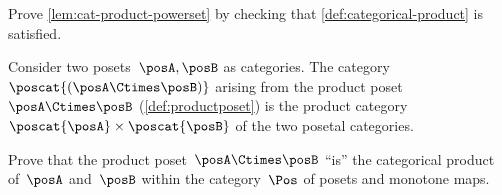 \vfill
\begin{gradedexercise}
    \label{ex:CatProductPowerset}
    Prove \cref{lem:cat-product-powerset} by checking that \cref{def:categorical-product} is satisfied.
\end{gradedexercise}


\begin{example}
    Consider two posets~$\posA,\posB$ as categories.
    The category~$\poscat{(\posA\Ctimes \posB)}$ arising from the product poset~$\posA\Ctimes \posB$ (\cref{def:productposet}) is the product category~$\poscat{\posA} \times \poscat{\posB}$ of the two posetal categories.
\end{example}

\begin{gradedexercise}
    Prove that the product poset~$\posA \Ctimes \posB$ ``is'' the categorical product of~$\posA$ and~$\posB$ within the category~$\Pos$ of posets and monotone maps.
\end{gradedexercise}

